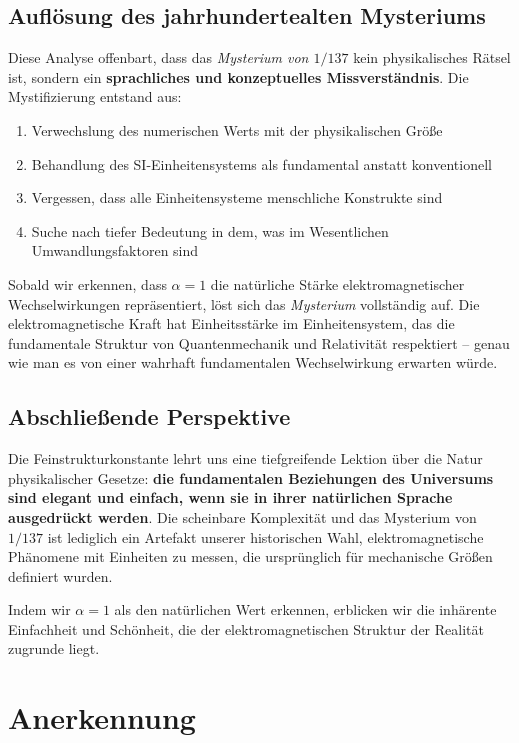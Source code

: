 	\subsection{Auflösung des jahrhundertealten Mysteriums}
	
	Diese Analyse offenbart, dass das \textit{Mysterium von $1/137$} kein physikalisches Rätsel ist, sondern ein \textbf{sprachliches und konzeptuelles Missverständnis}. Die Mystifizierung entstand aus:
	
	\begin{enumerate}
		\item Verwechslung des numerischen Werts mit der physikalischen Größe
		\item Behandlung des SI-Einheitensystems als fundamental anstatt konventionell
		\item Vergessen, dass alle Einheitensysteme menschliche Konstrukte sind
		\item Suche nach tiefer Bedeutung in dem, was im Wesentlichen Umwandlungsfaktoren sind
	\end{enumerate}
	
	Sobald wir erkennen, dass $\alpha = 1$ die natürliche Stärke elektromagnetischer Wechselwirkungen repräsentiert, löst sich das \textit{Mysterium} vollständig auf. Die elektromagnetische Kraft hat Einheitsstärke im Einheitensystem, das die fundamentale Struktur von Quantenmechanik und Relativität respektiert -- genau wie man es von einer wahrhaft fundamentalen Wechselwirkung erwarten würde.
	
	\subsection{Abschließende Perspektive}
	
	Die Feinstrukturkonstante lehrt uns eine tiefgreifende Lektion über die Natur physikalischer Gesetze: \textbf{die fundamentalen Beziehungen des Universums sind elegant und einfach, wenn sie in ihrer natürlichen Sprache ausgedrückt werden}. Die scheinbare Komplexität und das Mysterium von \textit{$1/137$} ist lediglich ein Artefakt unserer historischen Wahl, elektromagnetische Phänomene mit Einheiten zu messen, die ursprünglich für mechanische Größen definiert wurden.
	
	Indem wir $\alpha = 1$ als den natürlichen Wert erkennen, erblicken wir die inhärente Einfachheit und Schönheit, die der elektromagnetischen Struktur der Realität zugrunde liegt.
	
	\section{Anerkennung}
	
